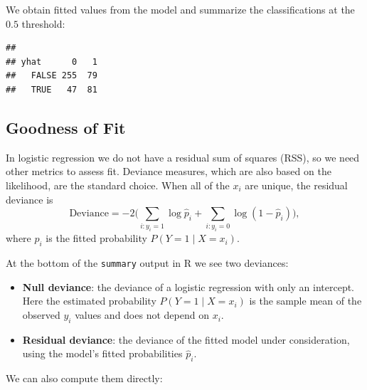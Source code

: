 \documentclass[
]{book}
\newenvironment{Shaded}{\begin{snugshade}}{\end{snugshade}}
\newcommand{\DecValTok}[1]{\textcolor[rgb]{0.00,0.00,0.81}{#1}}
\newcommand{\FloatTok}[1]{\textcolor[rgb]{0.00,0.00,0.81}{#1}}
\newcommand{\FunctionTok}[1]{\textcolor[rgb]{0.13,0.29,0.53}{\textbf{#1}}}
\newcommand{\NormalTok}[1]{#1}
\newcommand{\OtherTok}[1]{\textcolor[rgb]{0.56,0.35,0.01}{#1}}
\newcommand{\SpecialCharTok}[1]{\textcolor[rgb]{0.81,0.36,0.00}{\textbf{#1}}}
\begin{document}
We obtain fitted values from the model and summarize the classifications at the \(0.5\) threshold:

\begin{Shaded}
\end{Shaded}

\begin{verbatim}
##        
## yhat      0   1
##   FALSE 255  79
##   TRUE   47  81
\end{verbatim}

\subsection{Goodness of Fit}\label{goodness-of-fit}

In logistic regression we do not have a residual sum of squares (RSS), so we need other metrics to assess fit. Deviance measures, which are also based on the likelihood, are the standard choice. When all of the \(x_i\) are unique, the residual deviance is
\[
\mathrm{Deviance} = -2 \Biggl( \sum_{i: y_i=1} \log \hat{p}_i + \sum_{i: y_i=0} \log(1-\hat{p}_i) \Biggr),
\]
where \(\hat{p}_i\) is the fitted probability \(P(Y=1 \mid X=x_i)\).

At the bottom of the \texttt{summary} output in R we see two deviances:

\begin{itemize}
\item
  \textbf{Null deviance}: the deviance of a logistic regression with only an intercept. Here the estimated probability \(P(Y=1 \mid X=x_i)\) is the sample mean of the observed \(y_i\) values and does not depend on \(x_i\).
\item
  \textbf{Residual deviance}: the deviance of the fitted model under consideration, using the model's fitted probabilities \(\hat{p}_i\).
\end{itemize}

We can also compute them directly:

\begin{Shaded}
\end{Shaded}
\end{document}
